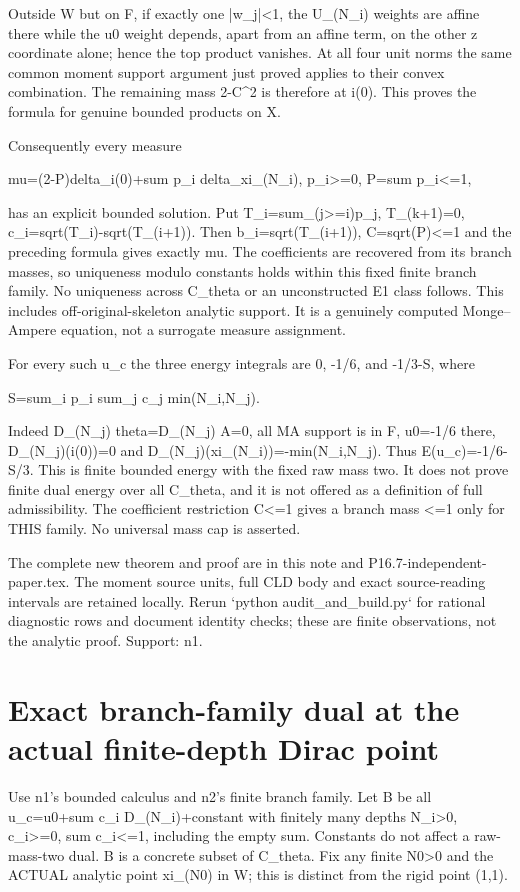 \documentclass[11pt]{article}
\begin{document}
Outside W but on F, if exactly one |w\_j|<1, the U\_(N\_i) weights are affine there while the u0 weight depends, apart from an affine term, on the other z coordinate alone; hence the top product vanishes. At all four unit norms the same common moment support argument just proved applies to their convex combination. The remaining mass 2-C\textasciicircum{}2 is therefore at i(0). This proves the formula for genuine bounded products on X.

Consequently every measure

mu=(2-P)delta\_i(0)+sum p\_i delta\_xi\_(N\_i), p\_i>=0, P=sum p\_i<=1,

has an explicit bounded solution. Put T\_i=sum\_(j>=i)p\_j, T\_(k+1)=0, c\_i=sqrt(T\_i)-sqrt(T\_(i+1)). Then b\_i=sqrt(T\_(i+1)), C=sqrt(P)<=1 and the preceding formula gives exactly mu. The coefficients are recovered from its branch masses, so uniqueness modulo constants holds within this fixed finite branch family. No uniqueness across C\_theta or an unconstructed E1 class follows. This includes off-original-skeleton analytic support. It is a genuinely computed Monge--Ampere equation, not a surrogate measure assignment.

For every such u\_c the three energy integrals are 0, -1/6, and -1/3-S, where

S=sum\_i p\_i sum\_j c\_j min(N\_i,N\_j).

Indeed D\_(N\_j) theta=D\_(N\_j) A=0, all MA support is in F, u0=-1/6 there, D\_(N\_j)(i(0))=0 and D\_(N\_j)(xi\_(N\_i))=-min(N\_i,N\_j). Thus E(u\_c)=-1/6-S/3. This is finite bounded energy with the fixed raw mass two. It does not prove finite dual energy over all C\_theta, and it is not offered as a definition of full admissibility. The coefficient restriction C<=1 gives a branch mass <=1 only for THIS family. No universal mass cap is asserted.

The complete new theorem and proof are in this note and P16.7-independent-paper.tex. The moment source units, full CLD body and exact source-reading intervals are retained locally. Rerun `python audit\_and\_build.py` for rational diagnostic rows and document identity checks; these are finite observations, not the analytic proof. Support: n1.

\section*{Exact branch-family dual at the actual finite-depth Dirac point}

Use n1's bounded calculus and n2's finite branch family. Let B be all u\_c=u0+sum c\_i D\_(N\_i)+constant with finitely many depths N\_i>0, c\_i>=0, sum c\_i<=1, including the empty sum. Constants do not affect a raw-mass-two dual. B is a concrete subset of C\_theta. Fix any finite N0>0 and the ACTUAL analytic point xi\_(N0) in W; this is distinct from the rigid point (1,1).
\end{document}
